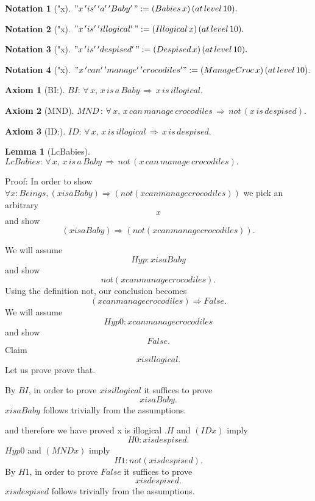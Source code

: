 \documentclass[11pt, oneside]{article}
\newtheorem{Lemma}{Lemma}
\newtheorem{Notation}{Notation}
\newtheorem{Axiom}{Axiom}
\begin{document}
\begin{Notation}["x] \label{Notation:"x}
$"x\,'is'\,'a'\,'Baby'\,":=(Babies\,x)\,(at\,level\,10).$
 \end{Notation}
\begin{Notation}["x] \label{Notation:"x}
$"x\,'is'\,'illogical'\,":=(Illogical\,x)\,(at\,level\,10).$
 \end{Notation}
\begin{Notation}["x] \label{Notation:"x}
$"x\,'is'\,'despised'\,":=(Despised\,x)\,(at\,level\,10).$
 \end{Notation}
\begin{Notation}["x] \label{Notation:"x}
$"x\,'can'\,'manage'\,'crocodiles'":=(ManageCroc\,x)\,(at\,level\,10).$
 \end{Notation}
\begin{Axiom}[BI:] \label{Axiom:BI:}
$BI:\,\forall \,x,\,x\,is\,a\,Baby\,\Rightarrow \,x\,is\,illogical.$
 \end{Axiom}
\begin{Axiom}[MND] \label{Axiom:MND}
$MND\,:\,\forall \,x,\,x\,can\,manage\,crocodiles\,\Rightarrow \,not\,(x\,is\,despised).$
 \end{Axiom}
\begin{Axiom}[ID:] \label{Axiom:ID:}
$ID:\,\forall \,x,\,x\,is\,illogical\,\Rightarrow \,x\,is\,despised.$
 \end{Axiom}
\begin{Lemma}[LcBabies] \label{Lemma:LcBabies}
$LcBabies:\,\forall \,x,\,x\,is\,a\,Baby\,\Rightarrow \,not\,(x\,can\,manage\,crocodiles).$
 \end{Lemma}


 Proof: In order to show $\forall x : Beings, (x is a Baby) \Rightarrow (not (x can manage crocodiles)) $ we pick an arbitrary $$x$$ and show $$(x is a Baby) \Rightarrow (not (x can manage crocodiles)) .$$

 We will assume $$Hyp : x is a Baby $$ and show $$not (x can manage crocodiles) .$$Using the definition not, our conclusion becomes $$(x can manage crocodiles) \Rightarrow False .$$We will assume $$Hyp0 : x can manage crocodiles $$ and show $$False .$$Claim $$x is illogical .$$ Let us prove prove that. 

 By $BI$, in order to prove $x is illogical $ it suffices to prove $$x is a Baby .$$ $x is a Baby $ follows trivially from the assumptions.

 and therefore we have proved x is illogical .$H$ and $(ID x)$ imply $$H0 : x is despised .$$ $Hyp0$ and $(MND x)$ imply $$H1 : not (x is despised) .$$ By $H1 $, in order to prove $False $ it suffices to prove $$x is despised .$$ $x is despised $ follows trivially from the assumptions.
\end{document}

